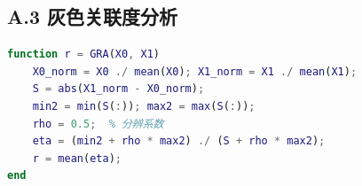 \documentclass[12pt,a4paper]{ctexart}
\begin{document}
\subsection*{A.3 灰色关联度分析}
\begin{lstlisting}[language=Matlab]
function r = GRA(X0, X1)
    X0_norm = X0 ./ mean(X0); X1_norm = X1 ./ mean(X1);
    S = abs(X1_norm - X0_norm);
    min2 = min(S(:)); max2 = max(S(:));
    rho = 0.5;  % 分辨系数
    eta = (min2 + rho * max2) ./ (S + rho * max2);
    r = mean(eta);
end
\end{lstlisting}
\end{document}
